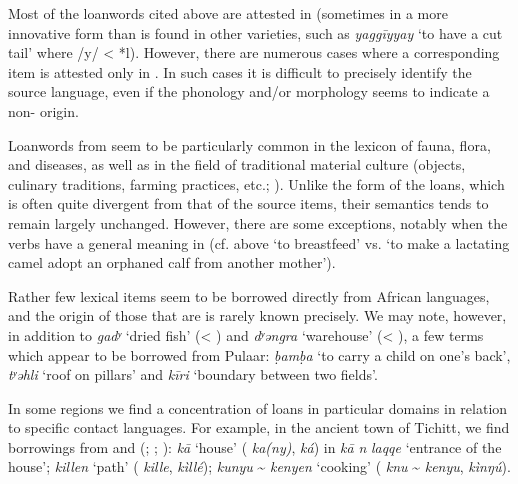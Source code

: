 \documentclass[output=paper]{langsci/langscibook}
\begin{document}
Most of the {loanwords} cited above are attested in  (sometimes in a more innovative form than is found in other  varieties, such as \textit{yaggīyyay} ‘to have a cut tail’ where /y/ < *l). However, there are numerous cases where a corresponding  item is attested only in . In such cases it is difficult to precisely identify the {source language}, even if the phonology and/or morphology seems to indicate a non- origin. 

Loanwords from  seem to be particularly common in the lexicon of fauna, flora, and diseases, as well as in the field of traditional material culture (objects, culinary traditions, farming practices, etc.; \citealt{Taine-Cheikh2010lexiques,Taine-Cheikh2014}). Unlike the form of the loans, which is often quite divergent from that of the source items, their semantics tends to remain largely unchanged. However, there are some exceptions, notably when the verbs have a general meaning in  (cf. above `to breastfeed' vs. `to make a lactating camel adopt an orphaned calf from another mother'). 


Rather few  lexical items seem to be borrowed directly from African languages, and the origin of those that are is rarely known precisely. We may note, however, in addition to \textit{gadʸ} ‘dried fish’ (< ) and \textit{dʸəngra} ‘warehouse’ (< ), a few terms which appear to be borrowed from Pulaar: \textit{ḅamḅa} ‘to carry a child on one’s back’, \textit{tʸəhli} ‘roof on pillars’ and \textit{kīri} ‘boundary between two fields’.

In some regions we find a concentration of loans in particular domains in relation to specific contact languages. For example, in the ancient town of Tichitt, we find borrowings from  and  (\citealt{Jacques-Meunié1961}; \citealt{Monteil1939}; \citealt{Diagana2013}): \textit{kā} ‘house’ ( \textit{ka(ny)},  \textit{ká}) in \textit{kā} \textit{n} \textit{laqqe} ‘entrance of the house’; \textit{killen} ‘path’ ( \textit{kille},  \textit{kìllé}); \textit{kunyu} \~{} \textit{kenyen} ‘cooking’ ( \textit{knu} \~{} \textit{kenyu},  \textit{kìnŋú}).
\end{document}
